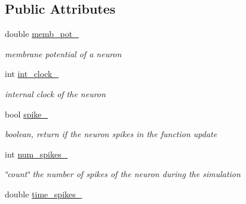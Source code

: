 \subsection*{Public Attributes}
\begin{DoxyCompactItemize}
\item 
\hypertarget{classNeuron_aec16bc28dca5791ac5d033cc9a55dab3}{double \hyperlink{classNeuron_aec16bc28dca5791ac5d033cc9a55dab3}{memb\-\_\-pot\-\_\-}}\label{classNeuron_aec16bc28dca5791ac5d033cc9a55dab3}

\begin{DoxyCompactList}\small\item\em membrane potential of a neuron \end{DoxyCompactList}\item 
\hypertarget{classNeuron_a3c9d3010041c4953fbd8f8a409ea6ac9}{int \hyperlink{classNeuron_a3c9d3010041c4953fbd8f8a409ea6ac9}{int\-\_\-clock\-\_\-}}\label{classNeuron_a3c9d3010041c4953fbd8f8a409ea6ac9}

\begin{DoxyCompactList}\small\item\em internal clock of the neuron \end{DoxyCompactList}\item 
\hypertarget{classNeuron_ae8ea5214f54fffb663fa502e73a4274a}{bool \hyperlink{classNeuron_ae8ea5214f54fffb663fa502e73a4274a}{spike\-\_\-}}\label{classNeuron_ae8ea5214f54fffb663fa502e73a4274a}

\begin{DoxyCompactList}\small\item\em boolean, return if the neuron spikes in the function update \end{DoxyCompactList}\item 
\hypertarget{classNeuron_a827cc8dee5f9f71ed3d6c0542c339a6f}{int \hyperlink{classNeuron_a827cc8dee5f9f71ed3d6c0542c339a6f}{num\-\_\-spikes\-\_\-}}\label{classNeuron_a827cc8dee5f9f71ed3d6c0542c339a6f}

\begin{DoxyCompactList}\small\item\em \char`\"{}count\char`\"{} the number of spikes of the neuron during the simulation \end{DoxyCompactList}\item 
\hypertarget{classNeuron_a23eee7236d51e80b97911d6f32d15324}{double \hyperlink{classNeuron_a23eee7236d51e80b97911d6f32d15324}{time\-\_\-spikes\-\_\-}}\label{classNeuron_a23eee7236d51e80b97911d6f32d15324}


\end{DoxyCompactItemize}
